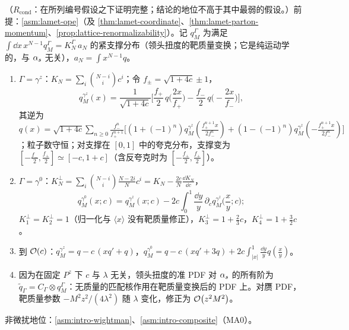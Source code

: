 \begin{proposition}\label{prop:lamet-tmc}
（$R_{\mathrm{cond}}$：在所列编号假设之下证明完整；结论的地位不高于其中最弱的假设。）前提：\cref{asm:lamet-ope}（及 \cref{thm:lamet-coordinate}、\cref{thm:lamet-parton-momentum}、\cref{prop:lattice-renormalizability}）。记 $q^\Gamma_M$ 为满足 $\int\dd x\,x^{N-1}q^\Gamma_M=K^\Gamma_N\,a_N$ 的紧支撑分布（领头扭度的靶质量变换；它是纯运动学的，与 $\alpha_s$ 无关），$a_N=\int x^{N-1}q$。
\begin{enumerate}[label=(\alph*),leftmargin=2em,itemsep=1pt,topsep=2pt]
\item $\Gamma=\gamma^z$：$K_N=\sum_i\binom{N-i}ic^i$；令 $f_\pm=\sqrt{1+4c}\pm1$，
\begin{equation}\label{eq:lamet-tmc-z}
q^{\gamma^z}_M(x)=\frac1{\sqrt{1+4c}}\Big[\frac{f_+}2\,q\Big(\frac{2x}{f_+}\Big)-\frac{f_-}2\,q\Big(-\frac{2x}{f_-}\Big)\Big],
\end{equation}%
其逆为 $q(x)=\sqrt{1+4c}\sum_{n\ge0}\frac{f_-^n}{f_+^{n+1}}\big[(1+(-1)^n)q^{\gamma^z}_M(\frac{f_+^{n+1}x}{2f_-^n})+(1-(-1)^n)q^{\gamma^z}_M(-\frac{f_+^{n+1}x}{2f_-^n})\big]$；粒子数守恒；对支撑在 $[0,1]$ 中的夸克分布，支撑变为 $[-\frac{f_-}2,\frac{f_+}2]\simeq[-c,1+c]$（含反夸克时为 $[-\frac{f_+}2,\frac{f_+}2]$）。
\item $\Gamma=\gamma^0$：$K^\perp_N=\sum_i\binom{N-i}i\frac{N-2i}Nc^i=K_N-\frac{2c}N\frac{\dd K_N}{\dd c}$，
\begin{equation}\label{eq:lamet-tmc-0}
q^{\gamma^0}_M(x;c)=q^{\gamma^z}_M(x;c)-2c\int_0^1\frac{\dd y}y\,\partial_c q^{\gamma^z}_M\Big(\frac xy;c\Big);
\end{equation}
$K^\perp_1=K^\perp_2=1$（归一化与 $\langle x\rangle$ 没有靶质量修正），$K^\perp_3=1+\frac23c$，$K^\perp_4=1+\frac32c$。
\item 到 $\mathcal{O}\!\left(c\right)$：$q^{\gamma^z}_M=q-c\,(xq'+q)$，$q^{\gamma^0}_M=q-c\,(xq'+3q)+2c\int_{|x|}^1\frac{\dd y}yq(\frac xy)$。
\item 因为在固定 $P^z$ 下 $c$ 与 $\lambda$ 无关，领头扭度的准 PDF 对 $\alpha_s$ 的所有阶为 $\tilde q_\Gamma=C_\Gamma\otimes q^\Gamma_M$：无质量的匹配核作用在靶质量变换后的 PDF 上。对赝 PDF，靶质量参数 $-M^2z^2/(4\lambda^2)$ 随 $\lambda$ 变化，修正为 $\mathcal{O}\!\left(z^2M^2\right)$。
\end{enumerate}
非微扰地位：\cref{asm:intro-wightman}、\cref{asm:intro-composite}（MA0）。
\end{proposition}

